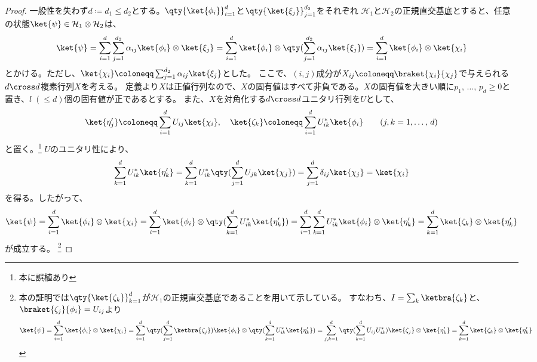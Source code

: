 \documentclass[a4paper,11pt,uplatex]{jsarticle}%
\begin{document}
\begin{proof}
  一般性を失わず$d\coloneqq d_1 \leq d_2$とする。$\qty{\ket{\phi_i}}_{i=1}^{d}$と$\qty{\ket{\xi_j}}_{j=1}^{d_2}$をそれぞれ
  $\mathcal{H}_1$と$\mathcal{H}_2$の正規直交基底とすると、任意の状態$\ket{\psi}\in\mathcal{H}_1\otimes\mathcal{H}_2$は、
  \begin{equation}
    \ket{\psi} = \sum_{i=1}^{d}\sum_{j=1}^{d_2}\alpha_{ij}\ket{\phi_i}\otimes\ket{\xi_j} 
    = \sum_{i=1}^{d}\ket{\phi_i}\otimes\qty(\sum_{j=1}^{d_2}\alpha_{ij}\ket{\xi_j}) = \sum_{i=1}^{d}\ket{\phi_i}\otimes\ket{\chi_i}
  \end{equation}
  とかける。ただし、$\ket{\chi_i}\coloneqq \sum_{j=1}^{d_2}\alpha_{ij}\ket{\xi_j}$とした。
  ここで、$(i,j)$成分が$X_{ij}\coloneqq\braket{\chi_i}{\chi_j}$で与えられる$d\cross d$複素行列$X$を考える。
  定義より$X$は正値行列なので、$X$の固有値はすべて非負である。$X$の固有値を大きい順に$p_1,\,\ldots,\,p_d\geq 0$と置き、$l\;(\leq d)$個の固有値が正であるとする。
  また、$X$を対角化する$d\cross d$ユニタリ行列を$U$として、
  \begin{equation}
    \ket{\eta_j'}\coloneqq \sum_{i=1}^{d}U_{ij}\ket{\chi_i},\quad \ket{\zeta_k} \coloneqq \sum_{i=1}^{d}U^*_{ik}\ket{\phi_i}\qquad(j,k=1,\ldots,\,d)
  \end{equation}
  と置く。\footnote{本に誤植あり}
  $U$のユニタリ性により、
  \begin{equation}
    \sum_{k=1}^d U^{*}_{ik}\ket{\eta_k'} = \sum_{k=1}^d U^{*}_{ik}\qty(\sum_{j=1}^{d}U_{jk}\ket{\chi_j}) = \sum_{j=1}^{d}\delta_{ij}\ket{\chi_j} = \ket{\chi_i}
  \end{equation}
  を得る。したがって、
  \begin{equation}
    \ket{\psi} = \sum_{i=1}^{d}\ket{\phi_i}\otimes\ket{\chi_i} = \sum_{i=1}^{d}\ket{\phi_i}\otimes\qty(\sum_{k=1}^{d}U^{*}_{ik}\ket{\eta_k'})
               = \sum_{i=1}^{d}\sum_{k=1}^{d}U^{*}_{ik}\ket{\phi_i}\otimes\ket{\eta_k'} = \sum_{k=1}^{d}\ket{\zeta_k}\otimes\ket{\eta_k'}
  \end{equation}
  が成立する。
  \footnote{本の証明では$\qty{\ket{\zeta_k}}_{k=1}^{d}$が$\mathcal{H}_1$の正規直交基底であることを用いて示している。
  すなわち、$I=\sum_{k}\ketbra{\zeta_k}$と、$\braket{\zeta_j}{\phi_i} = U_{ij}$より
  \begin{equation}
    \ket{\psi} = \sum_{i=1}^{d}\ket{\phi_i}\otimes\ket{\chi_i} = \sum_{i=1}^d\qty(\sum_{j=1}^{d}\ketbra{\zeta_j})\ket{\phi_i}\otimes\qty(\sum_{k=1}^{d}U^*_{ik}\ket{\eta_k'})
               = \sum_{j,k=1}^{d}\qty(\sum_{k=1}^d U_{ij}U^{*}_{ik})\ket{\zeta_j}\otimes\ket{\eta_k'} = \sum_{k=1}^{d}\ket{\zeta_k}\otimes\ket{\eta_k'}

\end{equation}}
\end{proof}
\end{document}
